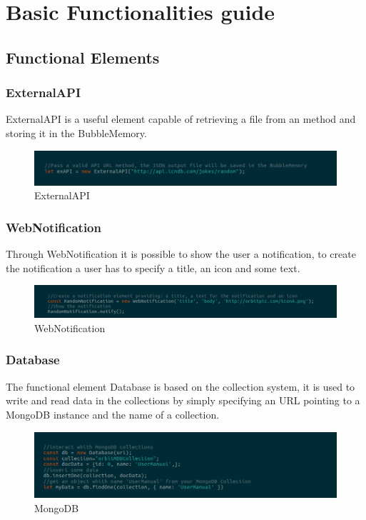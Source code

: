 \section{Basic Functionalities guide}
\subsection{Functional Elements}
\subsubsection{ExternalAPI}
ExternalAPI is a useful element capable of retrieving a  file from an  method and storing it in the BubbleMemory. 
\begin{figure}[H]
	\centering
	\includegraphics[width=14cm]{../../documenti/UserManualFramework/framework_model/1framework_model_api.png}
	\caption{ExternalAPI}
\end{figure}

\subsubsection{WebNotification}
Through WebNotification it is possible to show the user a notification, to create the notification a user has to specify a title, an icon and some text. 
\begin{figure}[H]
	\centering
	\includegraphics[width=14cm]{../../documenti/UserManualFramework/framework_model/2framework_model_notification.png}
	\caption{WebNotification}
\end{figure}

\subsubsection{Database}
The functional element Database is based on the  collection system, it is used to write and read data in the collections by simply specifying an URL pointing to a MongoDB instance and the name of a collection.
\begin{figure}[H]
	\centering
	\includegraphics[width=14cm]{../../documenti/UserManualFramework/framework_model/3framework_model_mongo.png}
	\caption{MongoDB}
\end{figure}

